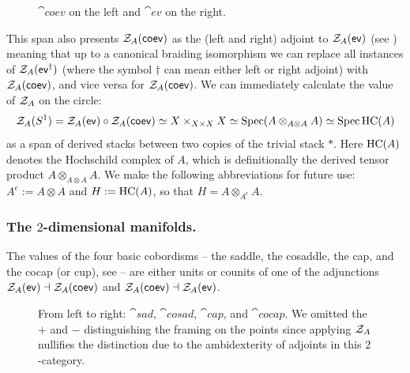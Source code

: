 \begin{figure}[h!]
	\centering
	
	\hspace{4em}
	
	\caption{$\cat{coev}$ on the left and $\cat{ev}$ on the right.}
	\label{fig:elbows}
\end{figure}

This span also presents $\mathcal{Z}_A(\mathsf{coev})$ as the (left and right) adjoint to $\mathcal{Z}_A(\mathsf{ev})$ (see ) meaning that up to a canonical braiding isomorphism we can replace all instances of $\mathcal{Z}_A(\mathsf{ev}^\dagger)$ (where the symbol $\dagger$ can mean either left or right adjoint) with $\mathcal{Z}_A(\mathsf{coev})$, and vice versa for $\mathcal{Z}_A(\mathsf{coev})$. We can immediately calculate the value of $\mathcal{Z}_A$ on the circle:
\begin{equation*}
	\mathcal{Z}_A(S^1) = \mathcal{Z}_A(\mathsf{ev}) \circ \mathcal{Z}_A(\mathsf{coev}) \simeq X \times_{X \times X} X \simeq \operatorname{Spec} (A \otimes_{A \otimes A} A) \simeq \operatorname{Spec} \mathrm{HC}(A)
\end{equation*}
as a span of derived stacks between two copies of the trivial stack $\ast$. Here $\mathrm{HC}(A)$ denotes the Hochschild complex of $A$, which is definitionally the derived tensor product $A \otimes_{A \otimes A} A$. We make the following abbreviations for future use: $A^e := A \otimes A$ and $H := \mathrm{HC}(A)$, so that $H = A \otimes_{A^e} A$.

\subsubsection{The $2$-dimensional manifolds.} The values of the four basic cobordisms -- the saddle, the cosaddle, the cap, and the cocap (or cup), see  -- are either units or counits of one of the adjunctions $\mathcal{Z}_A(\mathsf{ev}) \dashv \mathcal{Z}_A(\mathsf{coev})$ and $\mathcal{Z}_A(\mathsf{coev}) \dashv \mathcal{Z}_A(\mathsf{ev})$. 

\begin{figure}[h!]
	\centering
	
	\hspace{2em}
	
	\hspace{2em}
	\hspace{2em}
	\caption{From left to right: $\cat{sad}$, $\cat{cosad}$, $\cat{cap}$, and $\cat{cocap}$. We omitted the $+$ and $-$ distinguishing the framing on the points since applying $\mathcal{Z}_A$ nullifies the distinction due to the ambidexterity of adjoints in this $2$-category.}
	\label{fig:2-bords}
\end{figure}

